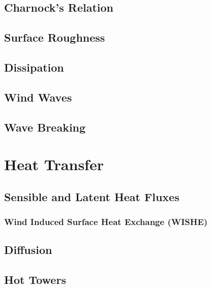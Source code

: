 \documentclass{report}
\begin{document}
    \section{Charnock's Relation}
\label{charnock}
    \lipsum[1-2]
  
    \section{Surface Roughness}
\label{surfaceroughness}
    \lipsum[1-2]

    \section{Dissipation}
\label{dissipation}
    \lipsum[1-2]  	

    \section{Wind Waves}
\label{windwaves}
    \lipsum[1-2]

    \section{Wave Breaking}
\label{momwavebreaking}
    \lipsum[1-2]

\chapter{Heat Transfer}
\label{heattransfer}
    \lipsum[10]
  
    \section{Sensible and Latent Heat Fluxes}
\label{heatflux}
    \lipsum[1-2]

\subsection{Wind Induced Surface Heat Exchange (WISHE)}
\label{wishe}
   
    \section{Diffusion}
\label{diffusion}
    \lipsum[1-2]

    \section{Hot Towers}
\label{hottowers}
    \lipsum[1-2]
\end{document}
